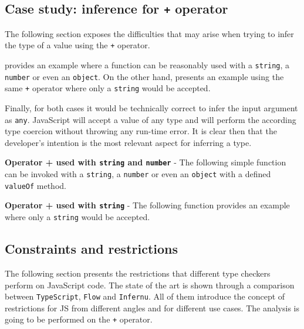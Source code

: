 \subsection{Case study: inference for \texttt{+} operator}

The following section exposes the difficulties that may arise when trying to infer the type of a value using the \texttt{+} operator.

 provides an example where a function can be reasonably used with a \texttt{string}, a \texttt{number} or even an \texttt{object}. On the other hand,  presents an example using the same \texttt{+} operator where only a \texttt{string} would be accepted.

Finally, for both cases it would be technically correct to infer the input argument as \texttt{any}. JavaScript will accept a value of any type and will perform the according type coercion without throwing any run-time error. It is clear then that the developer's intention is the most relevant aspect for inferring a type.

\begin{code}
  \captionsetup{aboveskip=0pt, belowskip=10pt}
  \caption[Operator + used with string and number]{\textbf{Operator + used with \texttt{string} and \texttt{number}} - The following simple function can be invoked with a \texttt{string}, a \texttt{number} or even an \texttt{object} with a defined \texttt{valueOf} method.}
  \label{code:type-inference-string-concatenation}
\end{code}

\begin{code}
  \captionsetup{aboveskip=0pt, belowskip=10pt}
  \caption[Operator + used only with string]{\textbf{Operator + used with \texttt{string}} - The following function provides an example where only a \texttt{string} would be accepted.}
  \label{code:type-inference-string-concatenation-only-string}
\end{code}

\subsection{Constraints and restrictions}
The following section presents the restrictions that different type checkers perform on JavaScript code. The state of the art is shown through a comparison between \texttt{TypeScript}, \texttt{Flow} and \texttt{Infernu}. All of them introduce the concept of restrictions for JS from different angles and for different use cases. The analysis is going to be performed on the \texttt{+} operator.

